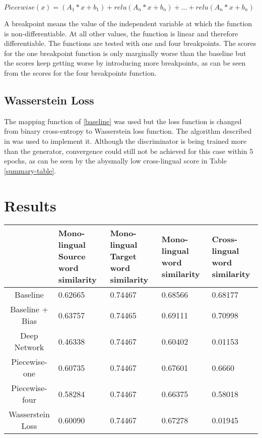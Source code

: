 \documentclass[11pt]{article}
\begin{document}
$Piecewise(x) = (A_1*x + b_1) + relu(A_n*x + b_n) + ... + relu(A_n*x + b_n)$

A breakpoint means the value of the independent variable at which the function is non-differentiable. At all other values, the function is linear and therefore differentiable. The functions are tested with one and four breakpoints. The scores for the one breakpoint function is only marginally worse than the baseline but the scores keep getting worse by introducing more breakpoints, as can be seen from the scores for the four breakpoints function.

\subsection{Wasserstein Loss}
The mapping function of \ref{baseline} was used but the loss function is changed from binary cross-entropy to Wasserstein loss function. The algorithm described in \cite{arjovsky2017wasserstein} was used to implement it. Although the discriminator is being trained more than the generator, convergence could still not be achieved for this case within 5 epochs, as can be seen by the abysmally low cross-lingual score in Table \ref{summary-table}.

\section{Results}

\begin{table*}[ht]
  \begin{center}
  \begin{tabular}{|c|l|l|l|l|}
  \hline
   & \multicolumn{1}{|p{3cm}|}{Mono-lingual Source word similarity}& \multicolumn{1}{|p{3cm}|}{Mono-lingual Target word similarity} & \multicolumn{1}{|p{3cm}|}{Mono-lingual word similarity} & \multicolumn{1}{|p{3cm}|}{Cross-lingual word similarity} \\
  \hline
  Baseline & 0.62665 & 0.74467 & 0.68566 & 0.68177  \\
  \hline
  Baseline + Bias & 0.63757 & 0.74465 & 0.69111 & 0.70998 \\
  \hline
  Deep Network & 0.46338 & 0.74467 & 0.60402 & 0.01153 \\
  \hline
  Piecewise-one & 0.60735 & 0.74467 & 0.67601 & 0.6660 \\
  \hline
  Piecewise-four & 0.58284 & 0.74467 & 0.66375 & 0.58018 \\
  \hline
  Wasserstein Loss & 0.60090 & 0.74467 & 0.67278 & 0.01945 \\
  \hline
  \end{tabular}
  \end{center}
  \caption{ Comparison of average scores for different experiments with English as source language and Spanish as target language}
  \label{summary-table}
\end{table*}
\end{document}
